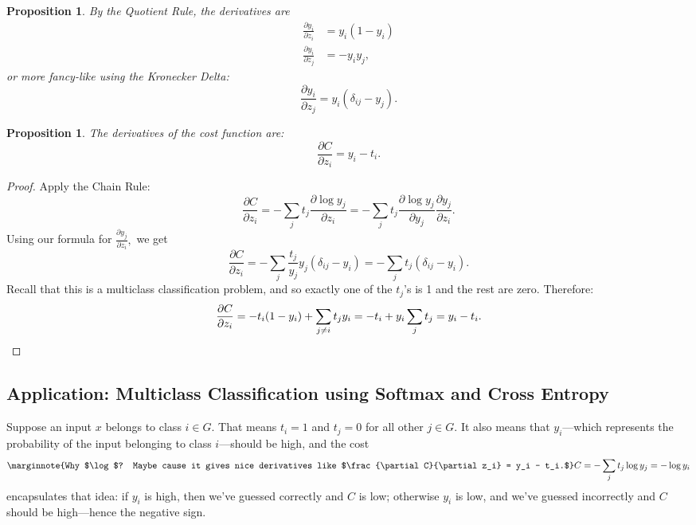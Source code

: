 \documentclass[12pt]{article}
\theoremstyle{plain}
\newtheorem{proposition}[theorem]{Proposition}
\theoremstyle{definition}
\theoremstyle{remark}
\begin{document}
\begin{mdframed}
\begin{proposition}
By the Quotient Rule, the derivatives are
\begin{align*}
\frac{\partial y_i}{\partial z_i} &= y_i(1 - y_i) \\
\frac{\partial y_i}{\partial z_j} &= -y_i y_j,
\end{align*}
or more fancy-like using the Kronecker Delta:
$$\frac{\partial y_i}{\partial z_j} = y_i(\delta_{ij} - y_j).$$
\end{proposition}
\end{mdframed}

\begin{mdframed}
\begin{proposition}
The derivatives of the cost function are:
$$\frac{\partial C}{\partial z_i} = y_i - t_i.$$
\end{proposition}
\end{mdframed}

\begin{proof}
Apply the Chain Rule:
$$\frac{\partial C}{\partial z_i} = - \sum_j t_j \frac{\partial \log y_j}{\partial z_i} = - \sum_j t_j \frac{\partial \log y_j}{\partial y_j} \frac{\partial y_j}{\partial z_i}.$$
Using our formula for $\frac{\partial y_j}{\partial z_i},$ we get 
$$\frac{\partial C}{\partial z_i} = - \sum_j \frac{t_j}{y_j} y_j(\delta_{ij} - y_i) = - \sum_j t_j (\delta_{ij} - y_i).$$
Recall that this is a multiclass classification problem, and so exactly one of the $t_j$'s is 1 and the rest are zero. Therefore:
$$\frac{\partial C}{\partial z_i} = - t_i (1 - y_i) + \sum_{j\neq i} t_j y_i = - t_i + y_i \sum_j t_j = y_i - t_i.\qedhere$$
\end{proof}

\subsection{Application: Multiclass Classification using Softmax and Cross Entropy}

Suppose an input $x$ belongs to class $i \in G.$ That means $t_i = 1$ and $t_j = 0$ for all other $j \in G.$ It also means that $y_i$---which represents the probability of the input belonging to class $i$---should be high, and the cost $$\marginnote{Why $\log$? Maybe cause it gives nice derivatives like $\frac{\partial C}{\partial z_i} = y_i - t_i.$}
C = - \sum_j t_j \log y_j = - \log y_i$$ encapsulates that idea: if $y_i$ is high, then we've guessed correctly and $C$ is low; otherwise $y_i$ is low, and we've guessed incorrectly and $C$ should be high---hence the negative sign.
\end{document}
